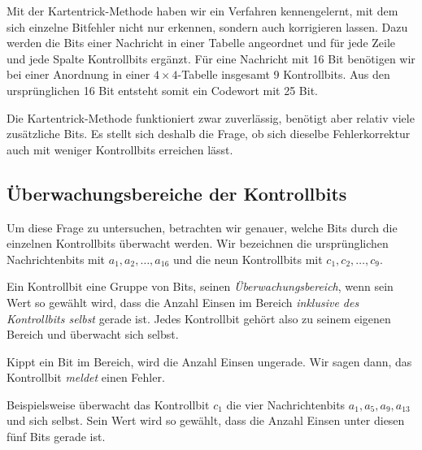 Mit der Kartentrick-Methode haben wir ein Verfahren kennengelernt,
mit dem sich einzelne Bitfehler nicht nur erkennen, sondern auch
korrigieren lassen. Dazu werden die Bits einer Nachricht in einer
Tabelle angeordnet und für jede Zeile und jede Spalte Kontrollbits
ergänzt. Für eine Nachricht mit 16 Bit benötigen wir bei einer
Anordnung in einer \(4\times 4\)-Tabelle insgesamt 9 Kontrollbits.
Aus den ursprünglichen 16 Bit entsteht somit ein Codewort mit
25 Bit.

Die Kartentrick-Methode funktioniert zwar zuverlässig, benötigt
aber relativ viele zusätzliche Bits. Es stellt sich deshalb die
Frage, ob sich dieselbe Fehlerkorrektur auch mit weniger
Kontrollbits erreichen lässt.


\subsection*{Überwachungsbereiche der Kontrollbits}

Um diese Frage zu untersuchen, betrachten wir genauer, welche Bits
durch die einzelnen Kontrollbits überwacht werden. Wir bezeichnen
die ursprünglichen Nachrichtenbits mit
\(a_1,a_2,\ldots,a_{16}\) und die neun Kontrollbits mit
\(c_1,c_2,\ldots,c_9\).

\begin{mydefinition}[Überwachen]\label{def:ueberwachen}
    Ein Kontrollbit  eine Gruppe von Bits, seinen
    \emph{Überwachungsbereich}, wenn sein Wert so gewählt wird, dass
    die Anzahl Einsen im Bereich \textit{inklusive des Kontrollbits
    selbst} gerade ist. Jedes Kontrollbit gehört also zu seinem
    eigenen Bereich und überwacht sich selbst.

    Kippt ein Bit im Bereich, wird die Anzahl Einsen ungerade. Wir
    sagen dann, das Kontrollbit \emph{meldet} einen Fehler.
\end{mydefinition}

Beispielsweise überwacht das Kontrollbit \(c_1\) die vier
Nachrichtenbits \(a_1,a_5,a_9,a_{13}\) und sich selbst. Sein Wert
wird so gewählt, dass die Anzahl Einsen unter diesen fünf Bits
gerade ist.

